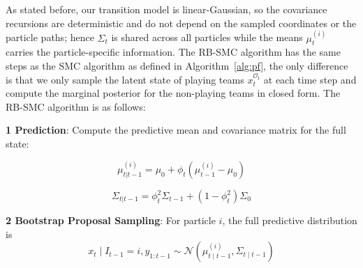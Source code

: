 As stated before, our transition model is linear-Gaussian, so the covariance recursions are deterministic and do not depend on the sampled coordinates or the particle paths; hence $\Sigma_t$ is shared across all particles while the means $\mu_t^{(i)}$ carries the particle-specific information. The RB-SMC algorithm has the same steps as the SMC algorithm as defined in Algorithm~\ref{alg:pf}, the only difference is that we only sample the latent state of playing teams $x_t^{\mathcal{O}_t}$ at each time step and compute the marginal posterior for the non-playing teams in closed form. The RB-SMC algorithm is as follows:


\textbf{1 Prediction}: Compute the predictive mean and covariance matrix for the full state:

\begin{equation*}
    \mu_{t|t-1}^{(i)} = \mu_0 + \phi_t (\mu_{t-1}^{(i)} - \mu_0)
\end{equation*}

\begin{equation*}
    \Sigma_{t|t-1} = \phi_t^2 \Sigma_{t-1} + (1 - \phi_t^2) \Sigma_0
\end{equation*}

\textbf{2 Bootstrap Proposal Sampling}: For particle $i$, the full predictive distribution is
\begin{equation}
x_t \mid I_{t-1}=i,y_{1:t-1} \sim \mathcal{N}\left(\mu_{t\mid t-1}^{(i)}, \Sigma_{t\mid t-1} \right) \end{equation}

